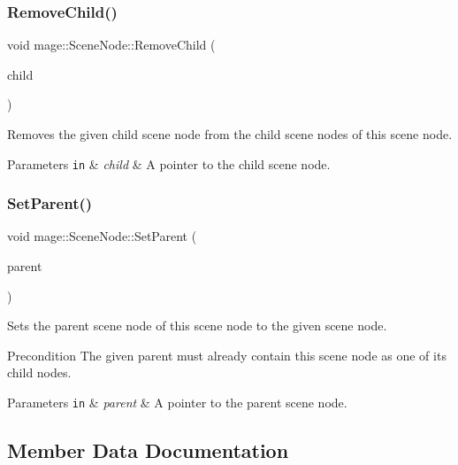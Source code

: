 \subsubsection{\texorpdfstring{Remove\+Child()}{RemoveChild()}}
{\footnotesize\ttfamily void mage\+::\+Scene\+Node\+::\+Remove\+Child (\begin{DoxyParamCaption}\item[{\hyperlink{classmage_1_1_scene_node}{Scene\+Node} $\ast$}]{child }\end{DoxyParamCaption})}

Removes the given child scene node from the child scene nodes of this scene node.


\begin{DoxyParams}[1]{Parameters}
\mbox{\tt in}  & {\em child} & A pointer to the child scene node. \\
\hline
\end{DoxyParams}
\hypertarget{classmage_1_1_scene_node_a27d5219ff4c1f2b1c37899456af518ae}{}\label{classmage_1_1_scene_node_a27d5219ff4c1f2b1c37899456af518ae} 
\subsubsection{\texorpdfstring{Set\+Parent()}{SetParent()}}
{\footnotesize\ttfamily void mage\+::\+Scene\+Node\+::\+Set\+Parent (\begin{DoxyParamCaption}\item[{\hyperlink{classmage_1_1_scene_node}{Scene\+Node} $\ast$}]{parent }\end{DoxyParamCaption})\hspace{0.3cm}{\ttfamily [private]}}

Sets the parent scene node of this scene node to the given scene node.

\begin{DoxyPrecond}{Precondition}
The given parent must already contain this scene node as one of its child nodes. 
\end{DoxyPrecond}

\begin{DoxyParams}[1]{Parameters}
\mbox{\tt in}  & {\em parent} & A pointer to the parent scene node. \\
\hline
\end{DoxyParams}


\subsection{Member Data Documentation}
\hypertarget{classmage_1_1_scene_node_afd031fb3c5ae4cef203fe8c85be0187e}{}\label{classmage_1_1_scene_node_afd031fb3c5ae4cef203fe8c85be0187e} 
